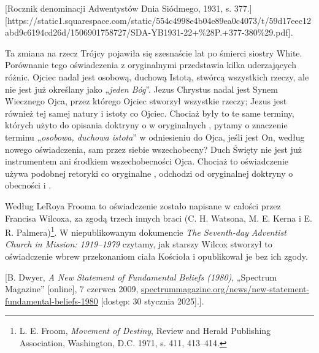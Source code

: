 [Rocznik denominacji Adwentystów Dnia Siódmego, 1931, s. 377.][https://static1.squarespace.com/static/554c4998e4b04e89ea0c4073/t/59d17eec12abd9c6194cd26d/1506901758727/SDA-YB1931-22+\%28P.+377-380\%29.pdf].

Ta zmiana na rzecz Trójcy pojawiła się szesnaście lat po śmierci siostry White. Porównanie tego oświadczenia z oryginalnymi  przedstawia kilka uderzających różnic. Ojciec nadal jest osobową, duchową Istotą, stwórcą wszystkich rzeczy, ale nie jest już określany jako „\textit{jeden Bóg}”. Jezus Chrystus nadal jest Synem Wiecznego Ojca, przez którego Ojciec stworzył wszystkie rzeczy; Jezus jest również tej samej natury i istoty co Ojciec. Chociaż były to te same terminy, których użyto do opisania doktryny o  w oryginalnych , pytamy o znaczenie terminu „\textit{osobowa, duchowa istota}” w odniesieniu do Ojca, jeśli jest On, według nowego oświadczenia, sam przez siebie wszechobecny? Duch Święty nie jest już instrumentem ani środkiem wszechobecności Ojca. Chociaż to oświadczenie używa podobnej retoryki co oryginalne , odchodzi od oryginalnej doktryny o obecności i .

Według LeRoya Frooma to oświadczenie zostało napisane w całości przez Francisa Wilcoxa, za zgodą trzech innych braci (C. H. Watsona, M. E. Kerna i E. R. Palmera)\footnote{L. E. Froom, \textit{Movement of Destiny}, Review and Herald Publishing Association, Washington, D.C. 1971, s. 411, 413--414.}. W niepublikowanym dokumencie \textit{The Seventh-day Adventist Church in Mission: 1919--1979} czytamy, jak starszy Wilcox stworzył to oświadczenie wbrew przekonaniom ciała Kościoła i opublikował je bez ich zgody.

[B. Dwyer, \textit{A New Statement of Fundamental Beliefs (1980)}, „Spectrum Magazine” [online], 7 czerwca 2009, \href{https://spectrummagazine.org/news/new-statement-fundamental-beliefs-1980/}{spectrummagazine.org/news/new-statement-fundamental-beliefs-1980} [dostęp: 30 stycznia 2025].].

